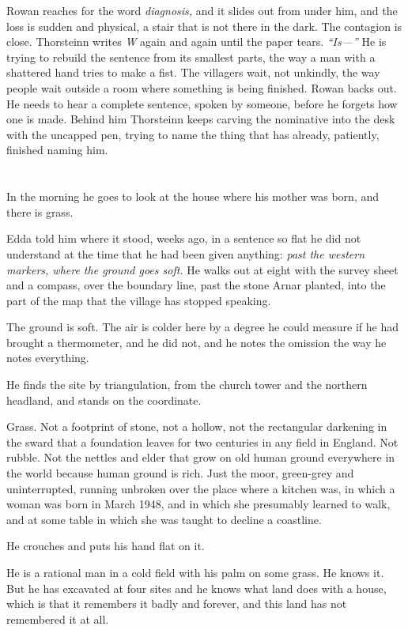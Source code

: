 \documentclass[11pt,oneside]{book}
\begin{document}
Rowan reaches for the word \emph{diagnosis,} and it slides out from
under him, and the loss is sudden and physical, a stair that is not
there in the dark. The contagion is close. Thorsteinn writes \emph{W}
again and again until the paper tears. \emph{``Is---''} He is trying to
rebuild the sentence from its smallest parts, the way a man with a
shattered hand tries to make a fist. The villagers wait, not unkindly,
the way people wait outside a room where something is being finished.
Rowan backs out. He needs to hear a complete sentence, spoken by
someone, before he forgets how one is made. Behind him Thorsteinn keeps
carving the nominative into the desk with the uncapped pen, trying to
name the thing that has already, patiently, finished naming him.

\chapter{}

In the morning he goes to look at the house where his mother was born,
and there is grass.

Edda told him where it stood, weeks ago, in a sentence so flat he did
not understand at the time that he had been given anything: \emph{past
the western markers, where the ground goes soft.} He walks out at eight
with the survey sheet and a compass, over the boundary line, past the
stone Arnar planted, into the part of the map that the village has
stopped speaking.

The ground is soft. The air is colder here by a degree he could measure
if he had brought a thermometer, and he did not, and he notes the
omission the way he notes everything.

He finds the site by triangulation, from the church tower and the
northern headland, and stands on the coordinate.

Grass. Not a footprint of stone, not a hollow, not the rectangular
darkening in the sward that a foundation leaves for two centuries in
any field in England. Not rubble. Not the nettles and elder that grow
on old human ground everywhere in the world because human ground is
rich. Just the moor, green-grey and uninterrupted, running unbroken over
the place where a kitchen was, in which a woman was born in March 1948,
and in which she presumably learned to walk, and at some table in which
she was taught to decline a coastline.

He crouches and puts his hand flat on it.

He is a rational man in a cold field with his palm on some grass. He
knows it. But he has excavated at four sites and he knows what land does
with a house, which is that it remembers it badly and forever, and this
land has not remembered it at all.
\end{document}
